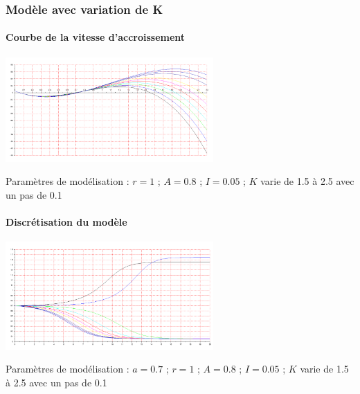 \documentclass{article}
\begin{document}
\paragraph{}

\subsubsection{Modèle avec variation de K}

\paragraph{Courbe de la vitesse d'accroissement}
\begin{center}
\includegraphics[width=300px]{img/part1/AlleeK.png}
\end{center}
Paramètres de modélisation : $r=1$ ; $A=0.8$ ; $I=0.05$ ; $K$ varie de 1.5 à 2.5 avec un pas de 0.1
\paragraph{}

\paragraph{Discrétisation du modèle}
\begin{center}
\includegraphics[width=300px]{img/part1/TrajK.png}
\end{center}
Paramètres de modélisation : $a=0.7$ ; $r=1$ ; $A=0.8$ ; $I=0.05$ ; $K$ varie de 1.5 à 2.5 avec un pas de 0.1
\paragraph{}
\end{document}
